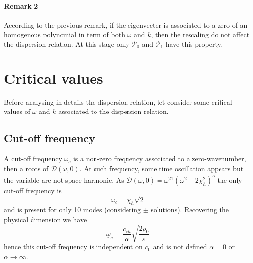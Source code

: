 \documentclass[
10pt, %
a4paper, %
oneside, %
headinclude,footinclude, %
table
]{scrartcl}
\begin{document}
\paragraph{\textbf{Remark 2}} According to the previous remark, if the eigenvector is associated to a zero of an homogenous polynomial in term of both $\omega$ and $k$, then  the rescaling do not affect the dispersion relation. At this stage only $\mathcal{P}_{0}$ and $\mathcal{P}_{1}$ have this property. 

\section{Critical values}
Before analysing in details the dispersion relation, let consider some critical values of $\omega$ and $k$ associated to the dispersion relation.
\subsection{Cut-off frequency}
A cut-off frequency $\omega_{c}$ is a non-zero frequency associated to a zero-wavenumber, then a roots of $\mathcal{D}(\omega,0)$. At such frequency, some time oscillation appears but the variable are not space-harmonic. As $\mathcal{D}(\omega,0)=\omega^{21}(\omega^2-2 \chi_{h}^2)^5$ the only cut-off frequency is 
$$
\boxed{\omega_{c}=\chi_{h}\sqrt{2}}
$$
 and is present for only 10 modes (considering $\pm$ solutions). Recovering the physical dimension we have
 $$
\underline{\omega}_{c}=\frac{c_{sh}}{\alpha} \sqrt{\frac{2\rho_{0}}{\varepsilon}}
 $$
 hence this cut-off frequency is independent on $c_{0}$ and is not defined $\alpha=0$ or $\alpha\to\infty$. 
 
\end{document}
